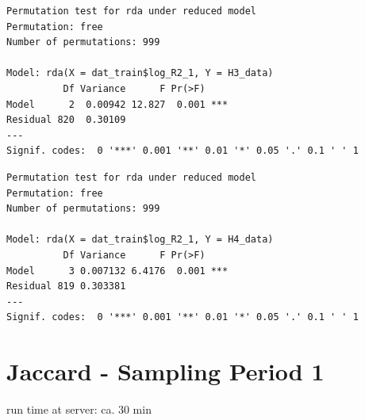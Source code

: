 \documentclass[
  letterpaper,
  DIV=11,
  numbers=noendperiod]{scrreprt}
\newenvironment{Shaded}{\begin{snugshade}}{\end{snugshade}}
\newcommand{\CommentTok}[1]{\textcolor[rgb]{0.37,0.37,0.37}{#1}}
\newcommand{\FunctionTok}[1]{\textcolor[rgb]{0.28,0.35,0.67}{#1}}
\newcommand{\NormalTok}[1]{\textcolor[rgb]{0.00,0.23,0.31}{#1}}
\newcommand{\SpecialCharTok}[1]{\textcolor[rgb]{0.37,0.37,0.37}{#1}}
\begin{document}
\begin{Shaded}
\end{Shaded}

\begin{verbatim}
Permutation test for rda under reduced model
Permutation: free
Number of permutations: 999

Model: rda(X = dat_train$log_R2_1, Y = H3_data)
          Df Variance      F Pr(>F)    
Model      2  0.00942 12.827  0.001 ***
Residual 820  0.30109                  
---
Signif. codes:  0 '***' 0.001 '**' 0.01 '*' 0.05 '.' 0.1 ' ' 1
\end{verbatim}

\begin{Shaded}
\end{Shaded}

\begin{verbatim}
Permutation test for rda under reduced model
Permutation: free
Number of permutations: 999

Model: rda(X = dat_train$log_R2_1, Y = H4_data)
          Df Variance      F Pr(>F)    
Model      3 0.007132 6.4176  0.001 ***
Residual 819 0.303381                  
---
Signif. codes:  0 '***' 0.001 '**' 0.01 '*' 0.05 '.' 0.1 ' ' 1
\end{verbatim}

\section{Jaccard - Sampling Period 1}

run time at server: ca. 30 min
\end{document}
